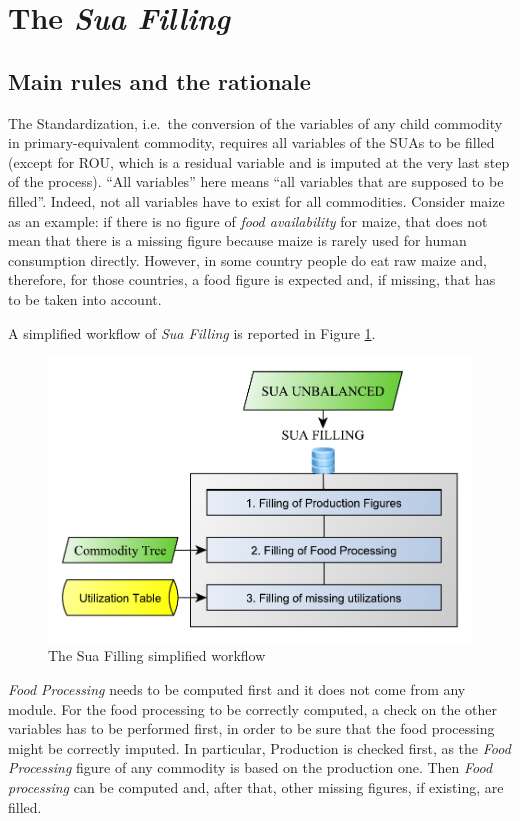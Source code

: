 \documentclass[]{article}
\begin{document}
\section{\texorpdfstring{The \emph{Sua
Filling}}{The Sua Filling}}\label{the-sua-filling}

\subsection*{Main rules and the
rationale}\label{main-rules-and-the-rationale}

The Standardization, i.e.~the conversion of the variables of any child
commodity in primary-equivalent commodity, requires all variables of the
SUAs to be filled (except for ROU, which is a residual variable and is
imputed at the very last step of the process). ``All variables'' here
means ``all variables that are supposed to be filled''. Indeed, not all
variables have to exist for all commodities. Consider maize as an
example: if there is no figure of \emph{food availability} for maize,
that does not mean that there is a missing figure because maize is
rarely used for human consumption directly. However, in some country
people do eat raw maize and, therefore, for those countries, a food
figure is expected and, if missing, that has to be taken into account.

A simplified workflow of \emph{Sua Filling} is reported in Figure
\ref{fig:f3}.

\begin{figure}[H]

{\centering \includegraphics[width=0.6\linewidth]{images/StandBal/03b_suaFilling} 

}

\caption{\label{fig:f3}The Sua Filling simplified workflow}\label{fig:f3}
\end{figure}

\emph{Food Processing} needs to be computed first and it does not come
from any module. For the food processing to be correctly computed, a
check on the other variables has to be performed first, in order to be
sure that the food processing might be correctly imputed. In particular,
Production is checked first, as the \emph{Food Processing} figure of any
commodity is based on the production one. Then \emph{Food processing}
can be computed and, after that, other missing figures, if existing, are
filled.
\end{document}
